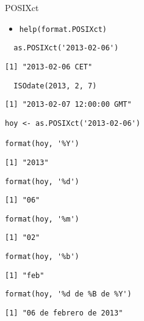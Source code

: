 \documentclass[xcolor={usenames,svgnames,dvipsnames}]{beamer}
\begin{document}
\begin{frame}[fragile,label={sec:org9ac4811}]{POSIXct}
 \begin{itemize}
\item \texttt{help(format.POSIXct)}
\end{itemize}
\lstset{language=r,label= ,caption= ,captionpos=b,numbers=none}
\begin{lstlisting}
  as.POSIXct('2013-02-06')
\end{lstlisting}

\begin{verbatim}
[1] "2013-02-06 CET"
\end{verbatim}

\lstset{language=r,label= ,caption= ,captionpos=b,numbers=none}
\begin{lstlisting}
  ISOdate(2013, 2, 7)
\end{lstlisting}

\begin{verbatim}
[1] "2013-02-07 12:00:00 GMT"
\end{verbatim}

\lstset{language=r,label= ,caption= ,captionpos=b,numbers=none}
\begin{lstlisting}
hoy <- as.POSIXct('2013-02-06')

format(hoy, '%Y')
\end{lstlisting}

\begin{verbatim}
[1] "2013"
\end{verbatim}

\lstset{language=r,label= ,caption= ,captionpos=b,numbers=none}
\begin{lstlisting}
format(hoy, '%d')
\end{lstlisting}

\begin{verbatim}
[1] "06"
\end{verbatim}

\lstset{language=r,label= ,caption= ,captionpos=b,numbers=none}
\begin{lstlisting}
format(hoy, '%m')
\end{lstlisting}

\begin{verbatim}
[1] "02"
\end{verbatim}

\lstset{language=r,label= ,caption= ,captionpos=b,numbers=none}
\begin{lstlisting}
format(hoy, '%b')
\end{lstlisting}

\begin{verbatim}
[1] "feb"
\end{verbatim}

\lstset{language=r,label= ,caption= ,captionpos=b,numbers=none}
\begin{lstlisting}
format(hoy, '%d de %B de %Y')
\end{lstlisting}

\begin{verbatim}
[1] "06 de febrero de 2013"
\end{verbatim}
\end{frame}
\end{document}
